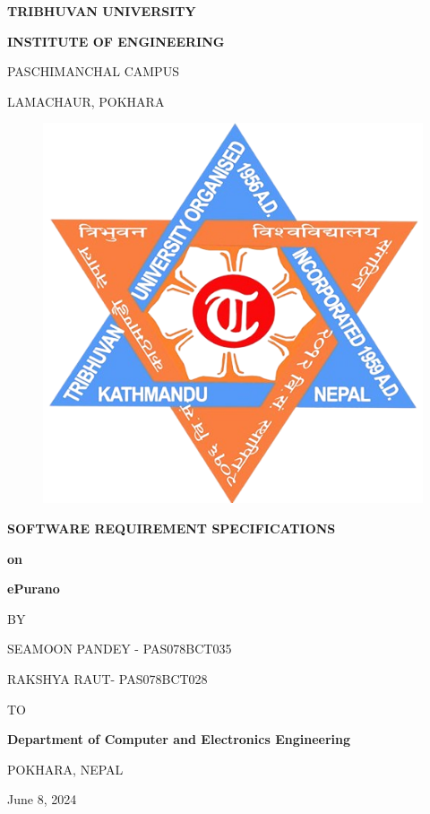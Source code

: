 \begin{titlepage}
    \thispagestyle{empty}
    \begin{center}
    
    \vspace*{\fill} %
    {\large \textbf{TRIBHUVAN UNIVERSITY
}\par}
{\large \textbf{INSTITUTE OF ENGINEERING
}\par}
\vspace{8pt}
PASCHIMANCHAL CAMPUS

LAMACHAUR, POKHARA
\vspace{24pt}

\begin{figure}[ht]
    \centering
    \includegraphics[scale=0.25]{../images/ioe-logo.png}
\end{figure}
\vspace{24pt}
{\textbf{SOFTWARE REQUIREMENT SPECIFICATIONS}\par \textbf{on} \par}
\vspace{14pt}
{\textbf{ ePurano }\par}

\vspace{14pt}
{BY\par}
\vspace{14pt}
    
{SEAMOON PANDEY - PAS078BCT035\par}
{RAKSHYA RAUT- PAS078BCT028\par}

\vspace{24pt}
{TO\par}
\vspace{14pt}
{\textbf{Department of Computer and
Electronics Engineering}\par}
{POKHARA, NEPAL\par}
{June 8, 2024\par}

    \vspace*{\fill}

    \end{center}
\end{titlepage}